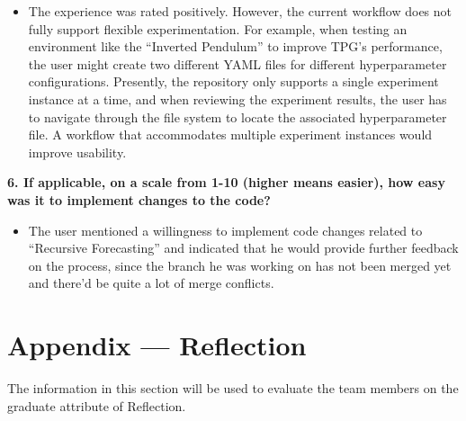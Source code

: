 \documentclass[12pt, titlepage]{article}
\begin{document}
\begin{itemize}
    \item The experience was rated positively. However, the current workflow does not fully 
          support flexible experimentation. For example, when testing an environment like
          the ``Inverted Pendulum'' to improve TPG's performance, the user might create two
          different YAML files for different hyperparameter configurations. Presently, the
          repository only supports a single experiment instance at a time, and when reviewing the
          experiment results, the user has to navigate through the file system to locate the
          associated hyperparameter file. A workflow that accommodates multiple experiment
          instances would improve usability.
\end{itemize}

\vspace{1em}

\textbf{6. If applicable, on a scale from 1-10 (higher means easier), how easy was it to implement changes to the code?}

\begin{itemize}
    \item The user mentioned a willingness to implement code changes related to 
          ``Recursive Forecasting'' and indicated that he would provide further feedback on the process, since the branch he was working on 
          has not been merged yet and there'd be quite a lot of merge conflicts.
\end{itemize}


\section*{Appendix --- Reflection}

The information in this section will be used to evaluate the team members on the
graduate attribute of Reflection.


\end{document}
